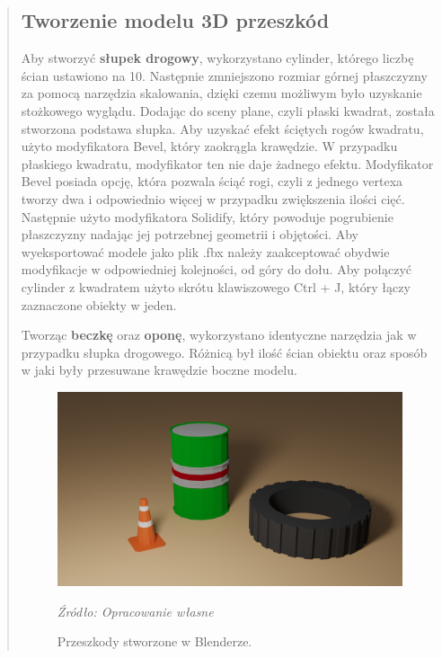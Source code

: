 \begin{quotation}
\newpage
\subsection{Tworzenie modelu 3D przeszkód}
\indent Aby stworzyć \textbf{słupek drogowy}, wykorzystano cylinder, którego liczbę ścian ustawiono na 10. Następnie zmniejszono rozmiar górnej płaszczyzny za pomocą narzędzia skalowania, dzięki czemu możliwym było uzyskanie stożkowego wyglądu. Dodając do sceny plane, czyli płaski kwadrat, została stworzona podstawa słupka. Aby uzyskać efekt ściętych rogów kwadratu, użyto modyfikatora Bevel, który zaokrągla krawędzie. W przypadku płaskiego kwadratu, modyfikator ten nie daje żadnego efektu. Modyfikator Bevel posiada opcję, która pozwala ściąć rogi, czyli z jednego vertexa tworzy dwa i odpowiednio więcej w przypadku zwiększenia ilości cięć. Następnie użyto modyfikatora Solidify, który powoduje pogrubienie płaszczyzny nadając jej potrzebnej geometrii i objętości. Aby wyeksportować modele jako plik .fbx należy zaakceptować obydwie modyfikacje w odpowiedniej kolejności, od góry do dołu. Aby połączyć cylinder z kwadratem użyto skrótu klawiszowego Ctrl + J, który łączy zaznaczone obiekty w jeden.

\indent Tworząc \textbf{beczkę} oraz \textbf{oponę}, wykorzystano identyczne narzędzia jak w przypadku słupka drogowego. Różnicą był ilość ścian obiektu oraz sposób w jaki były przesuwane krawędzie boczne modelu.

\begin{figure}[!hbt]
\centering
  \includegraphics[width=0.8\linewidth]{przeszkody.png}
  \caption{Przeszkody stworzone w Blenderze.}\label{rys_15}
  \begin{minipage}[t]{0.75\linewidth}
    \emph{Źródło: Opracowanie własne}
  \end{minipage}
\end{figure}


\newpage

\end{quotation}

